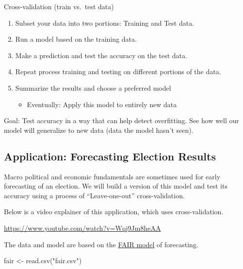 \documentclass[
  letterpaper,
  DIV=11,
  numbers=noendperiod]{scrreprt}
\newenvironment{Shaded}{\begin{snugshade}}{\end{snugshade}}
\newcommand{\FunctionTok}[1]{\textcolor[rgb]{0.28,0.35,0.67}{#1}}
\newcommand{\NormalTok}[1]{\textcolor[rgb]{0.00,0.23,0.31}{#1}}
\newcommand{\OtherTok}[1]{\textcolor[rgb]{0.00,0.23,0.31}{#1}}
\newcommand{\StringTok}[1]{\textcolor[rgb]{0.13,0.47,0.30}{#1}}
\providecommand{\tightlist}{%
  \setlength{\itemsep}{0pt}\setlength{\parskip}{0pt}}\usepackage{longtable,booktabs,array}
\begin{document}
Cross-validation (train vs.~test data)

\begin{enumerate}
\def\labelenumi{\arabic{enumi}.}
\tightlist
\item
  Subset your data into two portions: Training and Test data.
\item
  Run a model based on the training data.
\item
  Make a prediction and test the accuracy on the test data.
\item
  Repeat process training and testing on different portions of the data.
\item
  Summarize the results and choose a preferred model

  \begin{itemize}
  \tightlist
  \item
    Eventually: Apply this model to entirely new data
  \end{itemize}
\end{enumerate}

Goal: Test accuracy in a way that can help detect overfitting. See how
well our model will generalize to new data (data the model hasn't seen).

\hypertarget{application-forecasting-election-results}{%
\subsection{Application: Forecasting Election
Results}\label{application-forecasting-election-results}}

Macro political and economic fundamentals are sometimes used for early
forecasting of an election. We will build a version of this model and
test its accuracy using a process of ``Leave-one-out'' cross-validation.

Below is a video explainer of this application, which uses
cross-validation.

\url{https://www.youtube.com/watch?v=Wqj9Jm8heAA}

The data and model are based on the
\href{Based\%20on\%20the\%20FAIR\%20model\%20for\%20forecasting\%20elections\%20/url\%7Bhttps://fairmodel.econ.yale.edu/vote2016/computev.htm\%7D}{FAIR
model} of forecasting.

\begin{Shaded}
\begin{Highlighting}[]
\NormalTok{fair }\OtherTok{\textless{}{-}} \FunctionTok{read.csv}\NormalTok{(}\StringTok{"fair.csv"}\NormalTok{)}
\end{Highlighting}
\end{Shaded}
\end{document}
